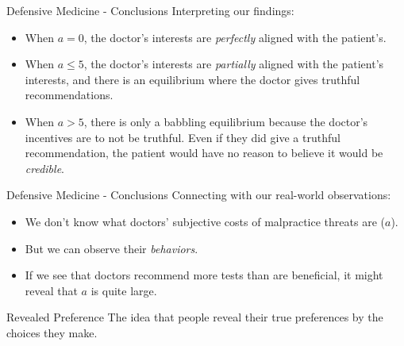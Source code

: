 
\begin{frame}{Defensive Medicine - Conclusions}
  Interpreting our findings:
  \begin{itemize}
    \item 
    When $a=0$, the doctor's interests are \textit{perfectly} aligned 
    with the patient's.
    \item 
    When $a\leq5$, the doctor's interests are \textit{partially} aligned 
    with the patient's interests,
    and there is an equilibrium where the doctor gives truthful recommendations.
    \item 
    When $a>5$, there is only a babbling equilibrium
    because the doctor's incentives are to not be truthful.
    Even if they did give a truthful recommendation,
    the patient would have no reason to believe it would be \textit{credible}.
  \end{itemize}
\end{frame}


\begin{frame}{Defensive Medicine - Conclusions}
  Connecting with our real-world observations:
  \begin{itemize}
    \item 
    We don't know what doctors' subjective costs of malpractice threats are
    ($a$).
    \item 
    But we can observe their \textit{behaviors}.
    \item 
    If we see that doctors recommend more tests than are beneficial,
    it might reveal that $a$ is quite large. 
  \end{itemize}
  \begin{block}{Revealed Preference}
    The idea that people reveal their true preferences by the choices they make.
  \end{block}
\end{frame}




